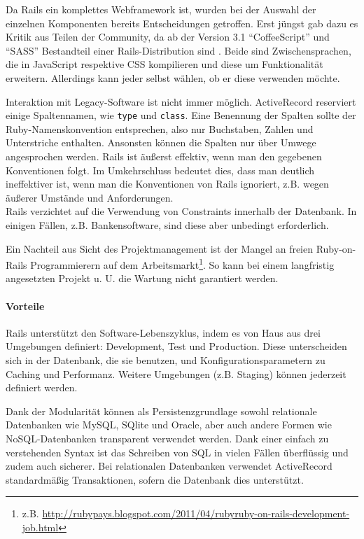  Da Rails ein komplettes Webframework ist, wurden bei der Auswahl der einzelnen Komponenten bereits Entscheidungen getroffen.  Erst jüngst gab dazu es Kritik aus Teilen der Community, da ab der Version 3.1 "`CoffeeScript"' und "`SASS"' Bestandteil einer Rails-Distribution sind \citep{peter_cooper_rails_2011}. Beide sind Zwischensprachen, die in JavaScript respektive CSS kompilieren und diese um Funktionalität erweitern. Allerdings kann jeder selbst wählen, ob er diese verwenden möchte.


Interaktion mit Legacy-Software ist nicht immer möglich. ActiveRecord reserviert einige Spaltennamen, wie \texttt{type} und \texttt{class}. Eine Benennung der Spalten sollte der Ruby-Namenskonvention entsprechen, also nur Buchstaben, Zahlen und Unterstriche enthalten. Ansonsten können die Spalten nur über Umwege angesprochen werden. Rails ist äußerst effektiv, wenn man den gegebenen Konventionen folgt. Im Umkehrschluss bedeutet dies, dass man deutlich ineffektiver ist, wenn man die Konventionen von Rails ignoriert, z.B. wegen äußerer Umstände und Anforderungen.\\
Rails verzichtet auf die Verwendung von Constraints innerhalb der Datenbank. In einigen Fällen, z.B. Bankensoftware, sind diese aber unbedingt erforderlich.

Ein Nachteil aus Sicht des Projektmanagement ist der Mangel an freien Ruby-on-Rails Programmierern auf dem Arbeitsmarkt\footnote{z.B. \url{http://rubypays.blogspot.com/2011/04/rubyruby-on-rails-development-job.html}}. So kann bei einem langfristig angesetzten Projekt u. U. die Wartung nicht garantiert werden.

\paragraph{Vorteile}
Rails unterstützt den Software-Lebenszyklus, indem es von Haus aus drei Umgebungen definiert: Development, Test und Production. Diese unterscheiden sich in der Datenbank, die sie benutzen, und Konfigurationsparametern zu Caching und Performanz. Weitere Umgebungen (z.B. Staging) können jederzeit definiert werden.


Dank der Modularität können als Persistenzgrundlage sowohl relationale Datenbanken wie MySQL, SQlite und Oracle, aber auch andere Formen wie NoSQL-Datenbanken transparent verwendet werden. Dank einer einfach zu verstehenden Syntax ist das Schreiben von SQL in vielen Fällen überflüssig und zudem auch sicherer. Bei relationalen Datenbanken verwendet ActiveRecord standardmäßig Transaktionen, sofern die Datenbank dies unterstützt.



